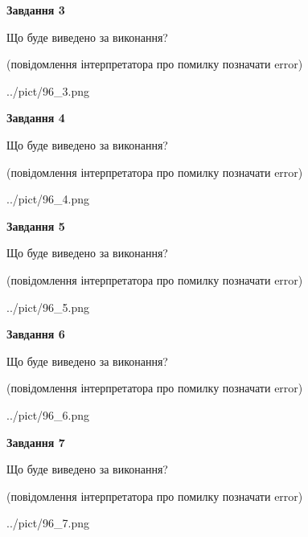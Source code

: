 \documentclass[12pt, ukrainian]{article}
\begin{document}
{\begin {large}
{\begin {center}\textbf{Завдання 3}\end {center}}\par
Що буде виведено за виконання?\par
 (повідомлення інтерпретатора про помилку позначати error)\par
\begin{center}
	{../pict/96_3.png}
\end{center}
\newpage

{\begin {center}\textbf{Завдання 4}\end {center}}\par
Що буде виведено за виконання?\par
 (повідомлення інтерпретатора про помилку позначати error)\par
\begin{center}
	{../pict/96_4.png}
\end{center}
\newpage

{\begin {center}\textbf{Завдання 5}\end {center}}\par
Що буде виведено за виконання?\par
 (повідомлення інтерпретатора про помилку позначати error)\par
\begin{center}
	{../pict/96_5.png}
\end{center}
\newpage

{\begin {center}\textbf{Завдання 6}\end {center}}\par
Що буде виведено за виконання?\par
 (повідомлення інтерпретатора про помилку позначати error)\par
\begin{center}
	{../pict/96_6.png}
\end{center}
\newpage

{\begin {center}\textbf{Завдання 7}\end {center}}\par
Що буде виведено за виконання?\par
 (повідомлення інтерпретатора про помилку позначати error)\par
\begin{center}
	{../pict/96_7.png}
\end{center}
\newpage


\end{large}}
\end{document}
